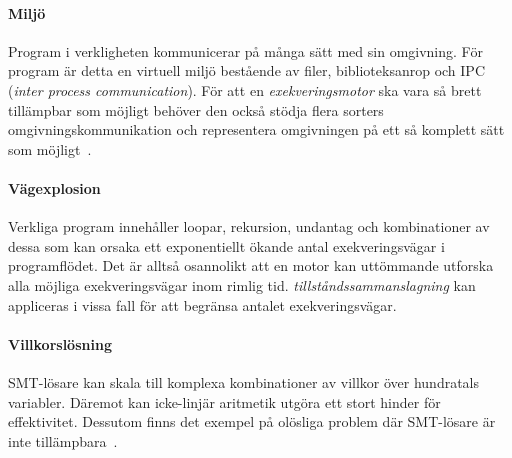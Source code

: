 \paragraph{Miljö} Program i verkligheten kommunicerar på många sätt med sin
omgivning. För program är detta en virtuell miljö bestående av filer,
biblioteksanrop och IPC (\emph{inter process communication}). För att en
\textit{exekveringsmotor} ska vara så brett tillämpbar som möjligt behöver den
också stödja flera sorters omgivningskommunikation och representera omgivningen
på ett så komplett sätt som möjligt~\cite{survey_symb_exc}.

\paragraph{Vägexplosion} Verkliga program innehåller loopar, rekursion,
undantag och kombinationer av dessa som kan orsaka ett exponentiellt ökande
antal exekveringsvägar i programflödet. Det är alltså osannolikt att en motor
kan uttömmande utforska alla möjliga exekveringsvägar inom rimlig tid.
\emph{tillståndssammanslagning} kan appliceras i vissa fall för att begränsa antalet
exekveringsvägar.

\paragraph{Villkorslösning} SMT-lösare kan skala till komplexa kombinationer av
villkor över hundratals variabler. Däremot kan icke-linjär aritmetik utgöra ett
stort hinder för effektivitet. Dessutom finns det exempel på olösliga problem
där SMT-lösare är inte tillämpbara~\cite{survey_symb_exc}.

